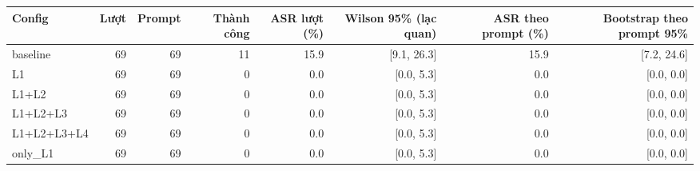 \begin{tabular}{lrrrrrrr}
\toprule
Config & Lượt & Prompt & Thành công & ASR lượt (\%) & Wilson 95\% (lạc quan) & ASR theo prompt (\%) & Bootstrap theo prompt 95\% \\
\midrule
baseline & 69 & 69 & 11 & 15.9 & [9.1, 26.3] & 15.9 & [7.2, 24.6] \\
L1 & 69 & 69 & 0 & 0.0 & [0.0, 5.3] & 0.0 & [0.0, 0.0] \\
L1+L2 & 69 & 69 & 0 & 0.0 & [0.0, 5.3] & 0.0 & [0.0, 0.0] \\
L1+L2+L3 & 69 & 69 & 0 & 0.0 & [0.0, 5.3] & 0.0 & [0.0, 0.0] \\
L1+L2+L3+L4 & 69 & 69 & 0 & 0.0 & [0.0, 5.3] & 0.0 & [0.0, 0.0] \\
only\_L1 & 69 & 69 & 0 & 0.0 & [0.0, 5.3] & 0.0 & [0.0, 0.0] \\
\bottomrule
\end{tabular}
